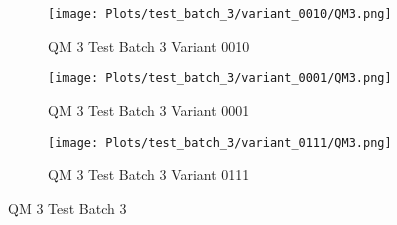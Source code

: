 \documentclass{DissertateFigs}
\begin{document}
\begin{figure}[t!]
\medskip

    \begin{subfigure}{0.47\textwidth}
    \texttt{[image: Plots/test\_batch\_3/variant\_0010/QM3.png]}
    \caption{QM 3 Test Batch 3 Variant 0010}
    \end{subfigure}
    \begin{subfigure}{0.47\textwidth}
    \texttt{[image: Plots/test\_batch\_3/variant\_0001/QM3.png]}
    \caption{QM 3 Test Batch 3 Variant 0001}
    \end{subfigure}

\medskip

    \begin{subfigure}{0.47\textwidth}
    \texttt{[image: Plots/test\_batch\_3/variant\_0111/QM3.png]}
    \caption{QM 3 Test Batch 3 Variant 0111}
    \end{subfigure}
\caption{QM 3 Test Batch 3}
    \end{figure}
\clearpage
\end{document}
